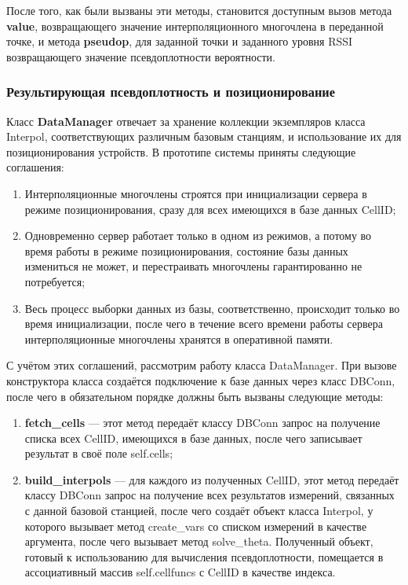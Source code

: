После того, как были вызваны эти методы, становится доступным вызов метода {\bf{}value}, возвращающего значение интерполяционного многочлена в переданной точке, и метода {\bf{}pseudop}, для заданной точки и заданного уровня RSSI возвращающего значение псевдоплотности вероятности.

\subsubsection{Результирующая псевдоплотность и позиционирование}

Класс {\bf{}DataManager} отвечает за хранение коллекции экземпляров класса Interpol, соответствующих различным базовым станциям, и использование их для позиционирования устройств. В прототипе системы приняты следующие соглашения:

\begin{enumerate}
	\item
		Интерполяционные многочлены строятся при инициализации сервера в режиме позиционирования, сразу для всех имеющихся в базе данных CellID;
	\item
		Одновременно сервер работает только в одном из режимов, а потому во время работы в режиме позиционирования, состояние базы данных измениться не может, и перестраивать многочлены гарантированно не потребуется;
	\item
		Весь процесс выборки данных из базы, соответственно, происходит только во время инициализации, после чего в течение всего времени работы сервера интерполяционные многочлены хранятся в оперативной памяти.
\end{enumerate}

С учётом этих соглашений, рассмотрим работу класса DataManager. При вызове конструктора класса создаётся подключение к базе данных через класс DBConn, после чего в обязательном порядке должны быть вызваны следующие методы:

\begin{enumerate}
	\item
		{\bf{}fetch\_cells} --- этот метод передаёт классу DBConn запрос на получение списка всех CellID, имеющихся в базе данных, после чего записывает результат в своё поле self.cells;
	\item
		{\bf{}build\_interpols} --- для каждого из полученных CellID, этот метод передаёт классу DBConn запрос на получение всех результатов измерений, связанных с данной базовой станцией, после чего создаёт объект класса Interpol, у которого вызывает метод create\_vars со списком измерений в качестве аргумента, после чего вызывает метод solve\_theta. Полученный объект, готовый к использованию для вычисления псевдоплотности, помещается в ассоциативный массив self.cellfuncs с CellID в качестве индекса.
\end{enumerate}

